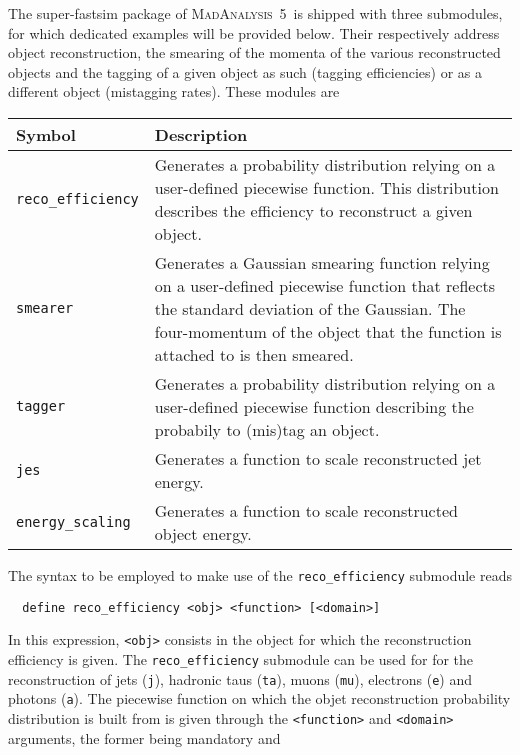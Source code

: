 \documentclass[a4paper]{article}
\newcommand{\MA}{\textsc{MadAnalysis}~5}
\begin{document}
\vspace{2cm}

\noindent The super-fastsim package of \MA\ is shipped with three
submodules, for which dedicated examples will be provided below. Their
respectively address object reconstruction, the smearing of the momenta of the
various reconstructed objects and the tagging of a given object as such (tagging
efficiencies) or as a different object (mistagging rates). These modules are
\renewcommand{\arraystretch}{1.2}%
\begin{center}\begin{tabular}{l p{8.4cm}}
  \hline
  Symbol& Description\\
  \hline
  \color{ao} \verb?reco_efficiency? & Generates a probability
    distribution relying on a user-defined piecewise function. This distribution
    describes the efficiency to reconstruct a given object.\\
  \color{ao} \verb?smearer?  &  Generates a Gaussian smearing function relying
    on a user-defined piecewise function that reflects the standard deviation of
    the Gaussian. The four-momentum of the object that the function is attached
    to is then smeared.\\
  \color{ao} \verb?tagger?   & Generates a probability distribution relying on a
    user-defined piecewise function describing the probabily to (mis)tag an
    object. \\
  \color{ao} \verb?jes?   & Generates a function to scale reconstructed jet energy. \\
  \color{ao} \verb?energy_scaling?   & Generates a function to scale reconstructed object energy. \\
    \hline
 \end{tabular}
\end{center}
\noindent The syntax to be employed to make use of the \verb+reco_efficiency+
submodule reads
{\color{ao} \begin{verbatim}
  define reco_efficiency <obj> <function> [<domain>]
\end{verbatim}}
\noindent In this expression, \verb+<obj>+ consists in the object for which the
reconstruction efficiency is given. The {\tt reco\_efficiency} submodule can be
used for for the reconstruction of jets (\verb+j+), hadronic taus (\verb+ta+),
muons (\verb+mu+),
electrons (\verb+e+) and photons (\verb+a+). The piecewise function on which the
objet reconstruction probability distribution is built from is given through the
{\tt <function>} and {\tt <domain>} arguments, the former being mandatory and
\end{document}
